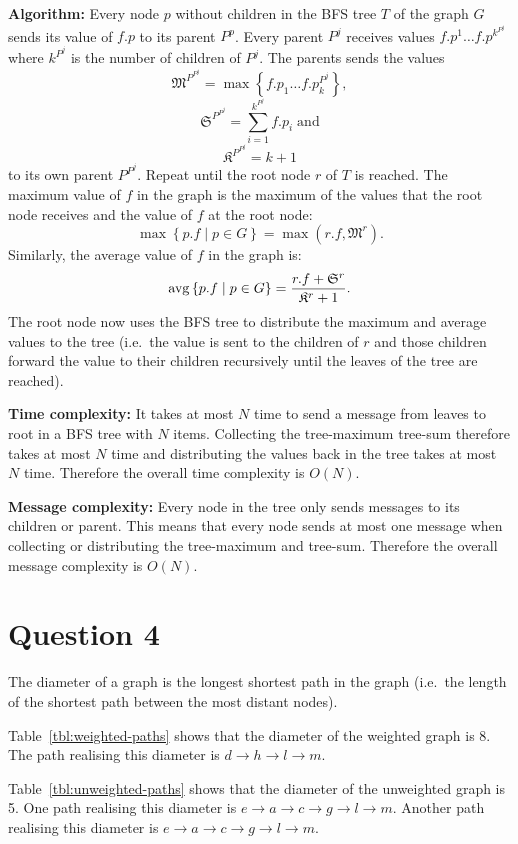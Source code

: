 \documentclass[a4paper,onecolumn,oneside]{article}
\DeclareMathOperator{\avg}{avg}
\begin{document}
\textbf{Algorithm:}  Every node $p$ without children in the BFS tree $T$ of the
graph $G$ sends its value of $f.p$ to its parent $P^p$.  Every parent $P^j$
receives values
$f.p^1\ldots f.p^{k^{P^j}}$ where $k^{P^j}$ is the number of children of $P^j$.
The parents sends the values
$$\mathfrak{M}^{P^{P^j}} = \max\left\{f.p_1\ldots f.p_k^{P^j}\right\},$$
$$\mathfrak{S}^{P^{P^j}} = \sum\limits_{i=1}^{k^{P^j}} f.p_i\;\mathrm{and}$$
$$\mathfrak{K}^{P^{P^j}} = k + 1$$
to its own parent $P^{P^j}$.
Repeat until the root node $r$ of $T$ is reached.  The maximum value of $f$ in
the graph is the maximum of the values that the root node receives and the value
of $f$ at the root node:
$$\max\left\{p.f \mid p \in G\right\} = \max(r.f, \mathfrak{M}^r).$$
Similarly, the average value
of $f$ in the graph is:
$$\avg\left\{p.f \mid p \in G\right\} = {r.f + \mathfrak{S}^r \over \mathfrak{K}^r + 1}.$$
The root node now uses the BFS tree to distribute the maximum and average values
to the tree (i.e.\ the value is sent to the children of $r$ and those children
forward the value to their children recursively until the leaves of the tree are
reached).

\textbf{Time complexity:}  It takes at most $N$ time to send a message from
leaves to root in a BFS tree with $N$ items.  Collecting the tree-maximum
tree-sum therefore takes at most $N$ time and distributing the values back in
the tree takes at most $N$ time.  Therefore the overall time complexity is
$O(N)$.

\textbf{Message complexity:}  Every node in the tree only sends messages to its
children or parent.  This means that every node sends at most one message when
collecting or distributing the tree-maximum and tree-sum.  Therefore the overall
message complexity is $O(N)$.

\section*{Question 4}

The diameter of a graph is the longest shortest path in the graph (i.e.\ the
length of the shortest path between the most distant nodes).

Table~\ref{tbl:weighted-paths} shows that the diameter of the weighted graph is
8.  The path realising this diameter is $d\rightarrow h\rightarrow l\rightarrow
m$.

Table~\ref{tbl:unweighted-paths} shows that the diameter of the unweighted graph
is 5.  One path realising this diameter is $e\rightarrow a\rightarrow
c\rightarrow g\rightarrow l\rightarrow m$.  Another path realising this diameter
is $e\rightarrow a\rightarrow c\rightarrow g\rightarrow l\rightarrow m$.
\end{document}
